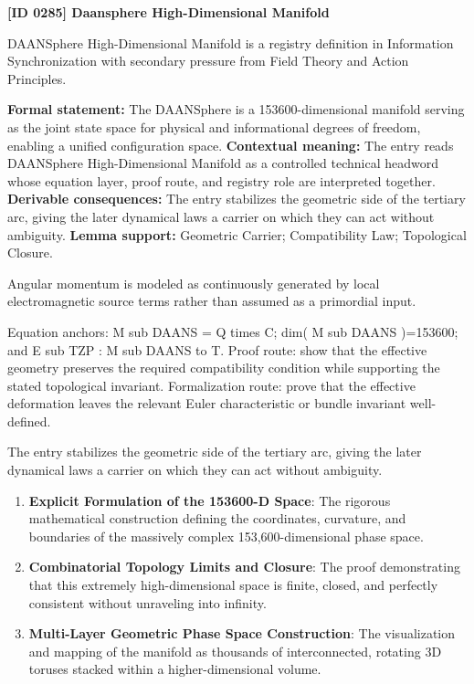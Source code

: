 \clearpage
\noindent\textbf{[ID 0285] Daansphere High-Dimensional Manifold}\par
\vspace{0.35em}
\begingroup\small
{}
DAANSphere High-Dimensional Manifold is a registry definition in Information Synchronization with secondary pressure from Field Theory and Action Principles.

\begingroup\footnotesize\setlength{\emergencystretch}{3em}\sloppy
\textbf{Formal statement:} The DAANSphere is a 153600-dimensional manifold serving as the joint state space for physical and informational degrees of freedom, enabling a unified configuration space. \textbf{Contextual meaning:} The entry reads DAANSphere High-Dimensional Manifold as a controlled technical headword whose equation layer, proof route, and registry role are interpreted together. \textbf{Derivable consequences:} The entry stabilizes the geometric side of the tertiary arc, giving the later dynamical laws a carrier on which they can act without ambiguity. \textbf{Lemma support:} Geometric Carrier; Compatibility Law; Topological Closure.\par
\endgroup

Angular momentum is modeled as continuously generated by local electromagnetic source terms rather than assumed as a primordial input.

Equation anchors: M sub DAANS = Q times C; dim( M sub DAANS )=153600; and E sub TZP : M sub DAANS to T. Proof route: show that the effective geometry preserves the required compatibility condition while supporting the stated topological invariant. Formalization route: prove that the effective deformation leaves the relevant Euler characteristic or bundle invariant well-defined.

The entry stabilizes the geometric side of the tertiary arc, giving the later dynamical laws a carrier on which they can act without ambiguity.
\endgroup

\begin{enumerate}[leftmargin=1.6em,itemsep=6pt,topsep=4pt]
\item \textbf{Explicit Formulation of the 153600-D Space}: The rigorous mathematical construction defining the coordinates, curvature, and boundaries of the massively complex 153,600-dimensional phase space.
\item \textbf{Combinatorial Topology Limits and Closure}: The proof demonstrating that this extremely high-dimensional space is finite, closed, and perfectly consistent without unraveling into infinity.
\item \textbf{Multi-Layer Geometric Phase Space Construction}: The visualization and mapping of the manifold as thousands of interconnected, rotating 3D toruses stacked within a higher-dimensional volume.
\end{enumerate}

